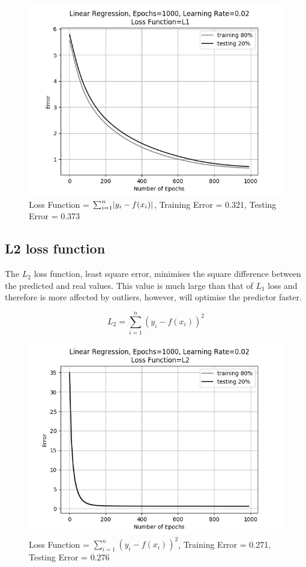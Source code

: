 \documentclass[10pt,twocolumn,letterpaper]{article}
\DeclarePairedDelimiter\abs{\lvert}{\rvert}%
\begin{document}
\begin{figure}[h]
	\begin{center}
		\includegraphics[width=0.9\linewidth]{img/l1loss.png}
	\end{center}
	\caption{Loss Function = $\sum_{i = 1}^{n} \abs{y_i - f(x_i)}$, Training Error = 0.321, Testing Error = 0.373}
	\label{fig:l1loss}
\end{figure}

\subsection{L2 loss function}
The $L_2$ loss function, least square error, minimises the square difference between the predicted and real values. This value is much large than that of $L_1$ loss and therefore is more affected by outliers, however, will optimise the predictor faster.

\begin{equation}
L_2 = \sum_{i = 1}^{n} (y_i - f(x_i))^2
\end{equation}

\begin{figure}[h]
	\begin{center}
		\includegraphics[width=0.9\linewidth]{img/l2loss.png}
	\end{center}
	\caption{Loss Function = $\sum_{i = 1}^{n} (y_i - f(x_i))^2$, Training Error = 0.271, Testing Error = 0.276}
	\label{fig:l2loss}
\end{figure}
\end{document}
